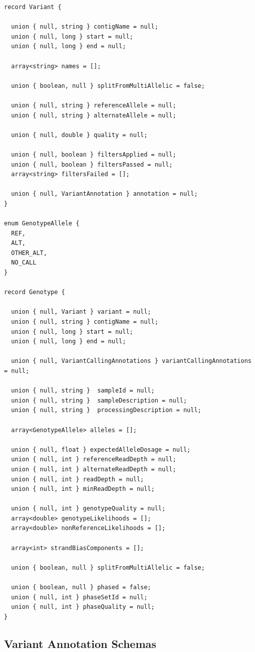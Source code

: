 \documentclass[phd]{ucbthesis}
\begin{document}
\begin{lstlisting}[caption={ADAM} core variant and genotype schemas]
record Variant {

  union { null, string } contigName = null;
  union { null, long } start = null;
  union { null, long } end = null;

  array<string> names = [];

  union { boolean, null } splitFromMultiAllelic = false;

  union { null, string } referenceAllele = null;
  union { null, string } alternateAllele = null;

  union { null, double } quality = null;

  union { null, boolean } filtersApplied = null;
  union { null, boolean } filtersPassed = null;
  array<string> filtersFailed = [];

  union { null, VariantAnnotation } annotation = null;
}

enum GenotypeAllele {
  REF,
  ALT,
  OTHER_ALT,
  NO_CALL
}

record Genotype {

  union { null, Variant } variant = null;
  union { null, string } contigName = null;
  union { null, long } start = null;
  union { null, long } end = null;

  union { null, VariantCallingAnnotations } variantCallingAnnotations = null;

  union { null, string }  sampleId = null;
  union { null, string }  sampleDescription = null;
  union { null, string }  processingDescription = null;

  array<GenotypeAllele> alleles = [];

  union { null, float } expectedAlleleDosage = null;
  union { null, int } referenceReadDepth = null;
  union { null, int } alternateReadDepth = null;
  union { null, int } readDepth = null;
  union { null, int } minReadDepth = null;

  union { null, int } genotypeQuality = null;
  array<double> genotypeLikelihoods = [];
  array<double> nonReferenceLikelihoods = [];

  array<int> strandBiasComponents = [];

  union { boolean, null } splitFromMultiAllelic = false;

  union { boolean, null } phased = false;
  union { null, int } phaseSetId = null;
  union { null, int } phaseQuality = null;
}
\end{lstlisting}

\subsection{Variant Annotation Schemas}
\label{sec:variant-annotation-schemas}
\end{document}
